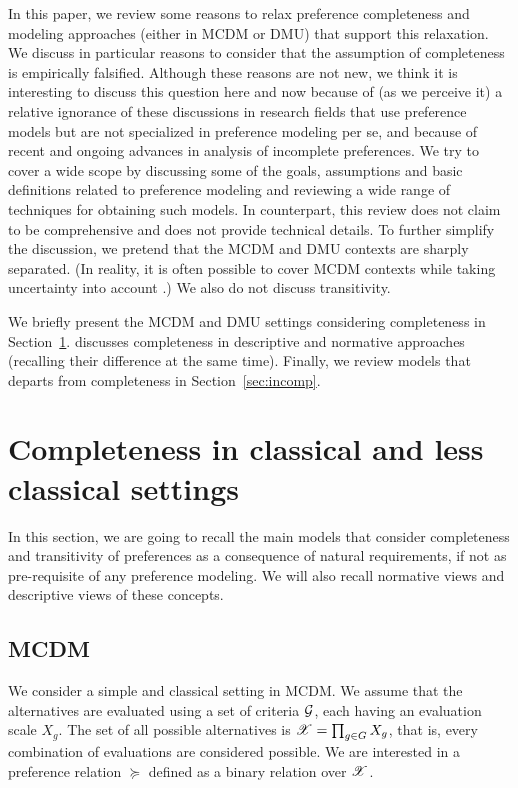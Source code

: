 \documentclass[french, english]{llncs}
\begin{document}
	In this paper, we review some reasons to relax preference completeness and modeling approaches (either in MCDM or DMU) that support this relaxation. We discuss in particular reasons to consider that the assumption of completeness is empirically falsified. Although these reasons are not new, we think it is interesting to discuss this question here and now because of (as we perceive it) a relative ignorance of these discussions in research fields that use preference models but are not specialized in preference modeling per se, and because of recent and ongoing advances in analysis of incomplete preferences.
We try to cover a wide scope by discussing some of the goals, assumptions and basic definitions related to preference modeling and reviewing a wide range of techniques for obtaining such models. In counterpart, this review does not claim to be comprehensive and does not provide technical details. To further simplify the discussion, we pretend that the MCDM and DMU contexts are sharply separated. (In reality, it is often possible to cover MCDM contexts while taking uncertainty into account \citep{keeney_decisions_1993}.) We also do not discuss transitivity.

We briefly present the MCDM and DMU settings considering completeness in Section~\ref{sec:review}.  discusses completeness in descriptive and normative approaches (recalling their difference at the same time). Finally, we review models that departs from completeness in Section~\ref{sec:incomp}.
	
	\section{Completeness in classical and less classical settings}\label{sec:review}
	In this section, we are going to recall the main models that consider completeness and transitivity of preferences as a consequence of natural requirements, if not as pre-requisite of any preference modeling. We will also recall normative views and descriptive views of these concepts. 
	
	\subsection{MCDM}
	We consider a simple and classical setting in MCDM. We assume that the alternatives are evaluated using a set of criteria $\mathcal{G}$, each having an evaluation scale $X_g$. The set of all possible alternatives is $\mathscr{X} = \prod_{g \in G} X_g$, that is, every combination of evaluations are considered possible. 
	We are interested in a preference relation $\succeq$ defined as a binary relation over $\mathscr{X}$.
\end{document}
